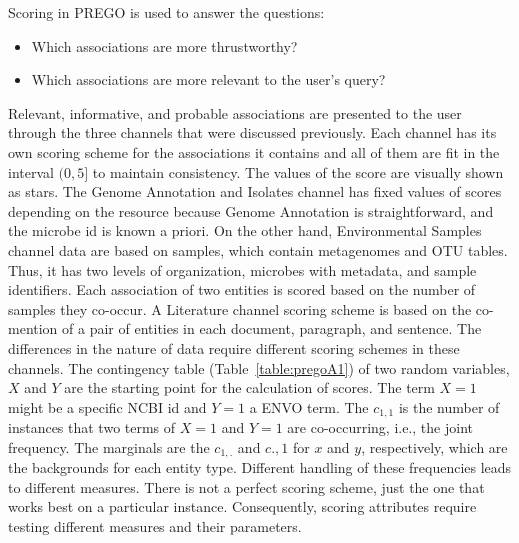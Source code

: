 Scoring in PREGO is used to answer the questions:
\begin{itemize}
   \item Which associations are more thrustworthy?
   \item Which associations are more relevant to the user's query?
\end{itemize}

Relevant, informative, and probable associations are presented to the user through the three channels that were discussed previously. 
Each channel has its own scoring scheme for the associations it contains and all of them are fit in the interval $(0,5]$ to maintain consistency. 
The values of the score are visually shown as stars. 
The Genome Annotation and Isolates channel has fixed values of scores depending on the resource because Genome Annotation is straightforward, and the microbe id is known a priori. 
On the other hand, Environmental Samples channel data are based on samples, which contain metagenomes and OTU tables. 
Thus, it has two levels of organization, microbes with metadata, and sample identifiers. Each association of two entities is scored based on the number of samples they co-occur. 
A Literature channel scoring scheme is based on the co-mention of a pair of entities in each document, paragraph, and sentence. The differences in the nature of data require different scoring schemes in these channels.
The contingency table (Table~\ref{table:pregoA1}) of two random variables, $X$ and $Y$ are the starting point for the calculation of scores. The term $X = 1$ might be a specific NCBI id and $Y = 1$ a ENVO term. 
The $c_{1,1}$ is the number of instances that two terms of $X = 1$ and $Y = 1$ are co-occurring, i.e., the joint frequency. 
The marginals are the $c_{1,.}$ and $c{.,1}$ for $x$ and $y$, respectively, which are the backgrounds for each entity type. 
Different handling of these frequencies leads to different measures. 
There is not a perfect scoring scheme, just the one that works best on a particular instance. 
Consequently, scoring attributes require testing different measures and their parameters.

